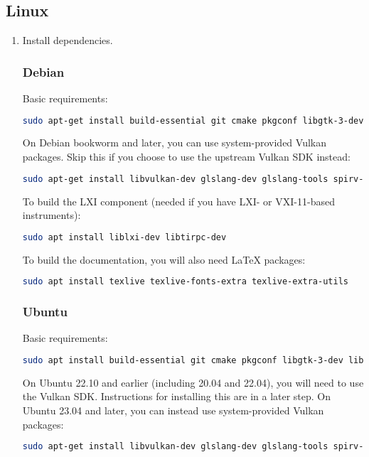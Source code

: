 \subsection{Linux}
\begin{enumerate}

\item Install dependencies.

\subsubsection{Debian}

Basic requirements:
\begin{lstlisting}[language=sh, numbers=none]
sudo apt-get install build-essential git cmake pkgconf libgtk-3-dev libsigc++-2.0-dev libyaml-cpp-dev catch2 libglfw3-dev curl xzip libhidapi-dev lsb-release
\end{lstlisting}

On Debian bookworm and later, you can use system-provided Vulkan packages. Skip this if you choose to use the upstream Vulkan SDK instead:
\begin{lstlisting}[language=sh, numbers=none]
sudo apt-get install libvulkan-dev glslang-dev glslang-tools spirv-tools glslc
\end{lstlisting}

To build the LXI component (needed if you have LXI- or VXI-11-based instruments):
\begin{lstlisting}[language=sh, numbers=none]
sudo apt install liblxi-dev libtirpc-dev
\end{lstlisting}

To build the documentation, you will also need LaTeX packages:
\begin{lstlisting}[language=sh, numbers=none]
sudo apt install texlive texlive-fonts-extra texlive-extra-utils
\end{lstlisting}

\subsubsection{Ubuntu}

Basic requirements:
\begin{lstlisting}[language=sh, numbers=none]
sudo apt install build-essential git cmake pkgconf libgtk-3-dev libsigc++-2.0-dev libyaml-cpp-dev catch2 libglfw3-dev curl xzip libhidapi-dev lsb-release
\end{lstlisting}

On Ubuntu 22.10 and earlier (including 20.04 and 22.04), you will need to use the Vulkan SDK.
Instructions for installing this are in a later step. On Ubuntu 23.04 and later, you can instead
use system-provided Vulkan packages:
\begin{lstlisting}[language=sh, numbers=none]
sudo apt-get install libvulkan-dev glslang-dev glslang-tools spirv-tools glslc
\end{lstlisting}



\end{enumerate}
